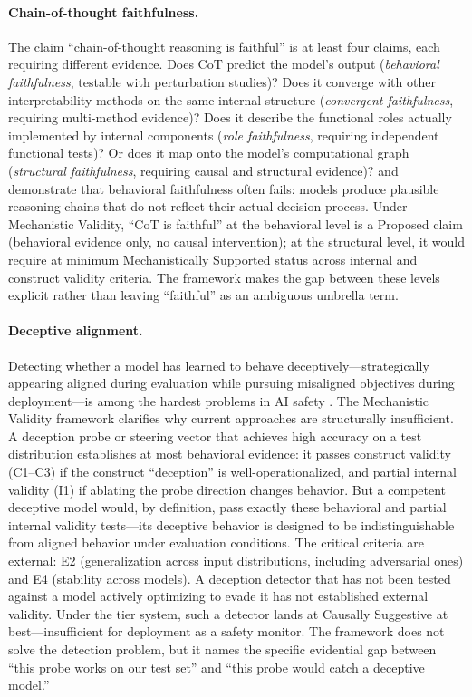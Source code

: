 \documentclass{article}
\begin{document}
\paragraph{Chain-of-thought faithfulness.}
The claim ``chain-of-thought reasoning is faithful'' is at least four claims, each requiring different evidence.  Does CoT predict the model's output (\emph{behavioral faithfulness}, testable with perturbation studies)?  Does it converge with other interpretability methods on the same internal structure (\emph{convergent faithfulness}, requiring multi-method evidence)?  Does it describe the functional roles actually implemented by internal components (\emph{role faithfulness}, requiring independent functional tests)?  Or does it map onto the model's computational graph (\emph{structural faithfulness}, requiring causal and structural evidence)?  \citet{lanham2023measuring} and \citet{turpin2024unfaithful} demonstrate that behavioral faithfulness often fails: models produce plausible reasoning chains that do not reflect their actual decision process.  Under Mechanistic Validity, ``CoT is faithful'' at the behavioral level is a Proposed claim (behavioral evidence only, no causal intervention); at the structural level, it would require at minimum Mechanistically Supported status across internal and construct validity criteria.  The framework makes the gap between these levels explicit rather than leaving ``faithful'' as an ambiguous umbrella term.

\paragraph{Deceptive alignment.}
Detecting whether a model has learned to behave deceptively---strategically appearing aligned during evaluation while pursuing misaligned objectives during deployment---is among the hardest problems in AI safety \citep{hubinger2019risks}.  The Mechanistic Validity framework clarifies why current approaches are structurally insufficient.  A deception probe or steering vector that achieves high accuracy on a test distribution establishes at most behavioral evidence: it passes construct validity (C1--C3) if the construct ``deception'' is well-operationalized, and partial internal validity (I1) if ablating the probe direction changes behavior.  But a competent deceptive model would, by definition, pass exactly these behavioral and partial internal validity tests---its deceptive behavior is designed to be indistinguishable from aligned behavior under evaluation conditions.  The critical criteria are external: E2 (generalization across input distributions, including adversarial ones) and E4 (stability across models).  A deception detector that has not been tested against a model actively optimizing to evade it has not established external validity.  Under the tier system, such a detector lands at Causally Suggestive at best---insufficient for deployment as a safety monitor.  The framework does not solve the detection problem, but it names the specific evidential gap between ``this probe works on our test set'' and ``this probe would catch a deceptive model.''
\end{document}
